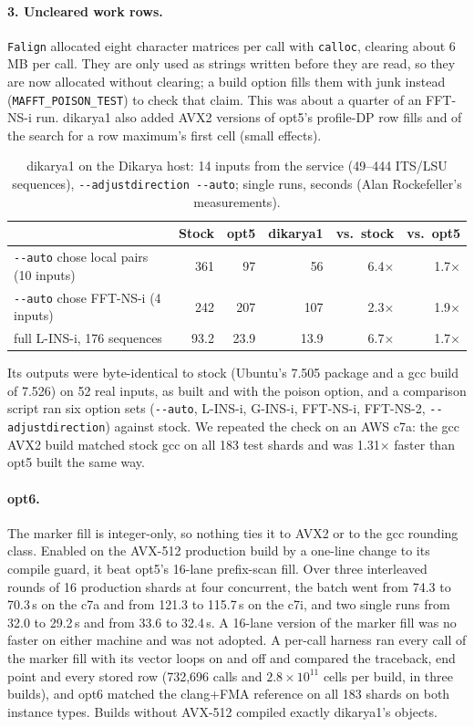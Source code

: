 \documentclass[11pt]{article}
\newcommand{\code}[1]{\texttt{#1}}
\begin{document}
\paragraph{3. Uncleared work rows.} \code{Falign} allocated eight character matrices per call
with \code{calloc}, clearing about 6\,MB per call. They are only used as strings written
before they are read, so they are now allocated without clearing; a build option fills them
with junk instead (\code{MAFFT\_POISON\_TEST}) to check that claim. This was about a quarter of
an FFT-NS-i run. dikarya1 also added AVX2 versions of opt5's profile-DP row fills and of the
search for a row maximum's first cell (small effects).

\begin{table}[h]
\centering
\caption{dikarya1 on the Dikarya host: 14 inputs from the service (49--444 ITS/LSU
sequences), \code{-{}-adjustdirection -{}-auto}; single runs, seconds (Alan Rockefeller's
measurements).}
\label{tab:dikarya}
\begin{tabular}{lrrrrr}
\toprule
& Stock & opt5 & dikarya1 & vs.\ stock & vs.\ opt5 \\
\midrule
\code{-{}-auto} chose local pairs (10 inputs) & 361 & 97 & 56 & 6.4$\times$ & 1.7$\times$ \\
\code{-{}-auto} chose FFT-NS-i (4 inputs) & 242 & 207 & 107 & 2.3$\times$ & 1.9$\times$ \\
full L-INS-i, 176 sequences & 93.2 & 23.9 & 13.9 & 6.7$\times$ & 1.7$\times$ \\
\bottomrule
\end{tabular}
\end{table}

Its outputs were byte-identical to stock (Ubuntu's 7.505 package and a gcc build of 7.526)
on 52 real inputs, as built and with the poison option, and a comparison script ran six
option sets (\code{-{}-auto}, L-INS-i, G-INS-i, FFT-NS-i, FFT-NS-2, \code{-{}-adjustdirection})
against stock. We repeated the check on an AWS c7a: the gcc AVX2 build matched stock gcc on
all 183 test shards and was 1.31$\times$ faster than opt5 built the same way.

\paragraph{opt6.} The marker fill is integer-only, so nothing ties it to AVX2 or to the gcc
rounding class. Enabled on the AVX-512 production build by a one-line change to its compile
guard, it beat opt5's 16-lane prefix-scan fill. Over three interleaved rounds of 16 production
shards at four concurrent, the batch went from 74.3 to 70.3\,s on the c7a and from 121.3 to
115.7\,s on the c7i, and two single runs from 32.0 to 29.2\,s and from 33.6 to 32.4\,s. A
16-lane version of the marker fill was no faster on either machine and was not adopted. A
per-call harness ran every call of the marker fill with its vector loops on and off and
compared the traceback, end point and every stored row (732{,}696 calls and
$2.8\times10^{11}$ cells per build, in three builds), and opt6 matched the clang+FMA reference
on all 183 shards on both instance types. Builds without AVX-512 compiled exactly dikarya1's
objects.
\end{document}
